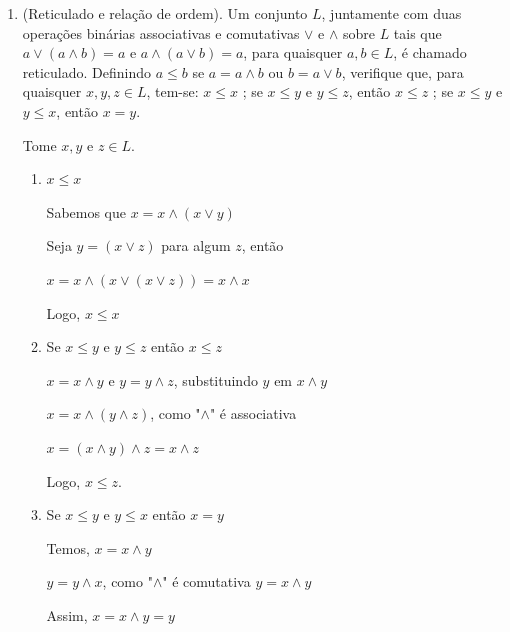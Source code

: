 \begin{enumerate}[label=1.\arabic*.]

Portanto, $(C,+,\cdot)$ é um \underline{anel comutativo} com unidade, mas não um corpo.

\item (Reticulado e relação de ordem). Um conjunto $L$, juntamente com duas operações 
binárias associativas e comutativas $\vee$ e $\wedge$ sobre $L$ tais que 
$a\vee(a\wedge b)=a$ e $a\wedge(a\vee b)=a$, para quaisquer $a,b\in L$, é chamado reticulado. 
Definindo $a\le b$ se $a=a\wedge b$ ou $b=a\vee b$, verifique que, para quaisquer $x,y,z\in L$, tem-se:
$x \le x$ ; se $x \le y$ e $y \le z$, então $x\le z$ ; se $x \le y$ e $y \le x$, então $x=y$.

Tome $x,y \text{ e } z \in L$.

\begin{enumerate}[label=\roman*.]
    \item $x \leq x$
    
    Sabemos que $x = x \wedge (x \vee y)$
    
    Seja $y = (x \vee z)$ para algum $z$, então

    $x = x \wedge (x \vee (x \vee z)) = x \wedge x$

    Logo, $x \leq x$

    \item Se $x \leq y \text{ e } y \leq z$ então $x \leq z$
    
    $x = x \wedge y$ e $y = y \wedge z$, substituindo $y$ em $x \wedge y$

    $x = x \wedge (y \wedge z)$, como "$\wedge$" é associativa

    $x = (x \wedge y) \wedge z = x \wedge z$
    
    Logo, $x \leq z$.

    \item Se $x \leq y \text{ e } y \leq x$ então $x = y$

    Temos, $x = x \wedge y$

    $y = y \wedge x$, como "$\wedge$" é comutativa $y = x \wedge y$

    Assim, $x = x \wedge y = y$


\end{enumerate}
\end{enumerate}
